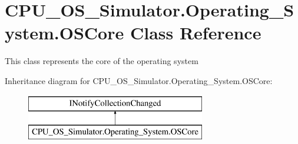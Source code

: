 \hypertarget{class_c_p_u___o_s___simulator_1_1_operating___system_1_1_o_s_core}{}\section{C\+P\+U\+\_\+\+O\+S\+\_\+\+Simulator.\+Operating\+\_\+\+System.\+O\+S\+Core Class Reference}
\label{class_c_p_u___o_s___simulator_1_1_operating___system_1_1_o_s_core}


This class represents the core of the operating system  


Inheritance diagram for C\+P\+U\+\_\+\+O\+S\+\_\+\+Simulator.\+Operating\+\_\+\+System.\+O\+S\+Core\+:\begin{figure}[H]
\begin{center}
\leavevmode
\includegraphics[height=2.000000cm]{class_c_p_u___o_s___simulator_1_1_operating___system_1_1_o_s_core}
\end{center}
\end{figure}
